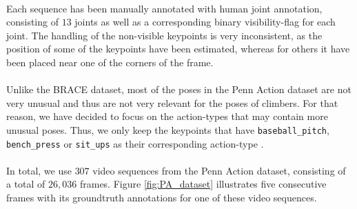 \documentclass[./main.tex]{subfiles}
\begin{document}
\\
Each sequence has been manually annotated with human joint annotation, consisting of $13$ joints as well as a corresponding binary visibility-flag for each joint. The handling of the non-visible keypoints is very inconsistent, as the position of some of the keypoints have been estimated, whereas for others it have been placed near one of the corners of the frame.
\\
\\
Unlike the BRACE dataset, most of the poses in the Penn Action dataset are not very unusual and thus are not very relevant for the poses of climbers. For that reason, we have decided to focus on the action-types that may contain more unusual poses. Thus, we only keep the keypoints that have \texttt{baseball\_pitch}, \texttt{bench\_press} or \texttt{sit\_ups} as their corresponding action-type \cite{penn_action}.
\\
\\
In total, we use $307$ video sequences from the Penn Action dataset, consisting of a total of $26,036$ frames. Figure \ref{fig:PA_dataset} illustrates five consecutive frames with its groundtruth annotations for one of these video sequences.
\end{document}
